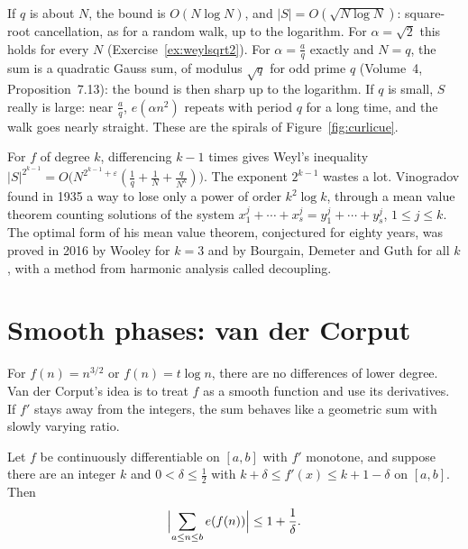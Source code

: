 If $q$ is about $N$, the bound is $O(N\log N)$, and $|S|=O(\sqrt{N\log N})$: square-root cancellation, as for a random walk, up to the logarithm. For $\alpha=\sqrt2$ this holds for every $N$ (Exercise~\ref{ex:weylsqrt2}).
For $\alpha=\frac aq$ exactly and $N=q$, the sum is a quadratic Gauss sum, of modulus $\sqrt q$ for odd prime $q$ (Volume~4, Proposition~7.13): the bound is then sharp up to the logarithm. If $q$ is small, $S$ really
is large: near $\frac aq$, $e(\alpha n^2)$ repeats with period $q$ for a long time, and the walk goes nearly straight. These are the spirals of Figure~\ref{fig:curlicue}.

\begin{remark}
For $f$ of degree $k$, differencing $k-1$ times gives Weyl's inequality $|S|^{2^{k-1}}=O\bigl(N^{2^{k-1}+\varepsilon}(\frac1q+\frac1N+\frac q{N^k})\bigr)$. The exponent $2^{k-1}$ wastes a lot. Vinogradov found in 1935 a way
to lose only a power of order $k^2\log k$, through a mean value theorem counting solutions of the system $x_1^j+\cdots+x_s^j=y_1^j+\cdots+y_s^j$, $1\le j\le k$. The optimal form of his mean value theorem,
conjectured for eighty years, was proved in 2016 by Wooley for $k=3$ and by Bourgain, Demeter and Guth for all $k$, with a method from harmonic analysis called decoupling.
\end{remark}

\section{Smooth phases: van der Corput}

For $f(n)=n^{3/2}$ or $f(n)=t\log n$, there are no differences of lower degree. Van der Corput's idea is to treat $f$ as a smooth function and use its derivatives. If $f'$ stays away from the integers, the
sum behaves like a geometric sum with slowly varying ratio.

\begin{lemma}\label{lem:kl}
Let $f$ be continuously differentiable on $[a,b]$ with $f'$ monotone, and suppose there are an integer $k$ and $0<\delta\le\frac12$ with $k+\delta\le f'(x)\le k+1-\delta$ on $[a,b]$. Then
\[
\Bigl|\sum_{a\le n\le b}e(f(n))\Bigr|\le1+\frac1\delta.
\]
\end{lemma}

